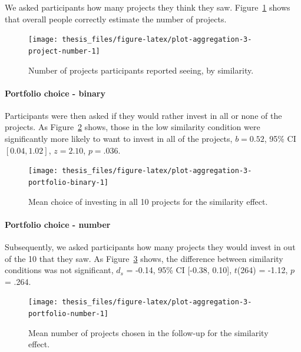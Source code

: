 \documentclass[a4paper, nobind, dvipsnames]{templates/ociamthesis}
\theoremstyle{definition}
\theoremstyle{definition}
\theoremstyle{definition}
\theoremstyle{definition}
\theoremstyle{remark}
\begin{document}
We asked participants how many projects they think they saw.
Figure~\ref{fig:plot-aggregation-3-project-number} shows that overall people
correctly estimate the number of projects.



\begin{figure}
\texttt{[image: thesis\_files/figure-latex/plot-aggregation-3-project-number-1]} \caption{Number of projects participants reported seeing, by similarity.}\label{fig:plot-aggregation-3-project-number}
\end{figure}

\paragraph{Portfolio choice - binary}

Participants were then asked if they would rather invest in all or none of the
projects. As Figure~\ref{fig:plot-aggregation-3-portfolio-binary} shows, those
in the low similarity condition were significantly more likely to want to invest
in all of the projects,
\(b = 0.52\), 95\% CI \([0.04, 1.02]\), \(z = 2.10\), \(p = .036\).



\begin{figure}
\texttt{[image: thesis\_files/figure-latex/plot-aggregation-3-portfolio-binary-1]} \caption{Mean choice of investing in all 10 projects for the similarity effect.}\label{fig:plot-aggregation-3-portfolio-binary}
\end{figure}

\paragraph{Portfolio choice - number}

Subsequently, we asked participants how many projects they would invest in out
of the 10 that they saw. As
Figure~\ref{fig:plot-aggregation-3-portfolio-number} shows, the difference
between similarity conditions was not significant,
\(d_s\) = -0.14, 95\% CI {[}-0.38, 0.10{]}, \(t\)(264) = -1.12, \(p\) = .264.



\begin{figure}
\texttt{[image: thesis\_files/figure-latex/plot-aggregation-3-portfolio-number-1]} \caption{Mean number of projects chosen in the follow-up for the similarity effect.}\label{fig:plot-aggregation-3-portfolio-number}
\end{figure}
\end{document}
